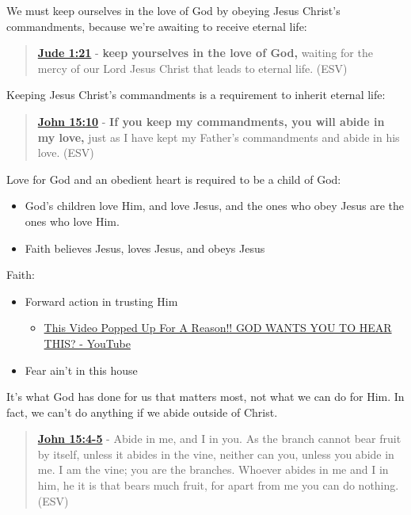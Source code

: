 \documentclass[11pt]{article}
\begin{document}
We must keep ourselves in the love of God by obeying Jesus Christ's commandments, because we're awaiting to receive eternal life:

\begin{quote}
\textbf{\href{https://www.biblegateway.com/passage/?search=Jude\%201\%3A21\&version=ESV}{Jude 1:21}} - \textbf{keep yourselves in the love of God,} waiting for the mercy of our Lord Jesus Christ that leads to eternal life. (ESV)
\end{quote}

Keeping Jesus Christ's commandments is a requirement to inherit eternal life:

\begin{quote}
\textbf{\href{https://www.biblegateway.com/passage/?search=John\%2015\%3A10\&version=ESV}{John 15:10}} - \textbf{If you keep my commandments, you will abide in my love,} just as I have kept my Father's commandments and abide in his love. (ESV)
\end{quote}

Love for God and an obedient heart is required to be a child of God:
\begin{itemize}
\item God's children love Him, and love Jesus, and the ones who obey Jesus are the ones who love Him.
\item Faith believes Jesus, loves Jesus, and obeys Jesus
\end{itemize}

Faith:
\begin{itemize}
\item Forward action in trusting Him
\begin{itemize}
\item \href{https://www.youtube.com/watch?v=YKVN-wCqraE}{This Video Popped Up For A Reason!! GOD WANTS YOU TO HEAR THIS? - YouTube}
\end{itemize}
\item Fear ain't in this house
\end{itemize}

It's what God has done for us that matters most, not what we can do for Him.
In fact, we can't do anything if we abide outside of Christ.

\begin{quote}
\textbf{\href{https://www.biblegateway.com/passage/?search=John\%2015\%3A4-5\&version=ESV}{John 15:4-5}} - Abide in me, and I in you. As the branch cannot bear fruit by itself, unless it abides in the vine, neither can you, unless you abide in me. I am the vine; you are the branches. Whoever abides in me and I in him, he it is that bears much fruit, for apart from me you can do nothing. (ESV)
\end{quote}
\end{document}
